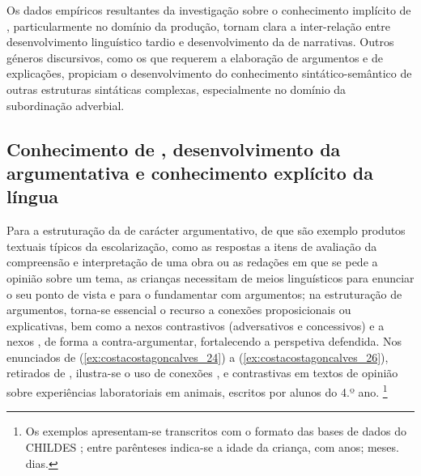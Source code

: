 \documentclass[output=paper]{LSP/langsci}
\begin{document}
Os dados empíricos resultantes da investigação sobre o conhecimento implícito de , particularmente no domínio da produção, tornam clara a inter-relação entre desenvolvimento linguístico tardio e desenvolvimento da  de narrativas. Outros géneros discursivos, como os que requerem a elaboração de argumentos e de explicações, propiciam o desenvolvimento do conhecimento sintático-semântico de outras estruturas sintáticas complexas, especialmente no domínio da subordinação adverbial. 

\subsection{Conhecimento de , desenvolvimento da  argumentativa e conhecimento explícito da língua}
\label{subsec:costacostagoncalves_conhecimento_concess}

Para a estruturação da  de carácter argumentativo, de que são exemplo produtos textuais típicos da escolarização, como as respostas a itens de avaliação da compreensão e interpretação de uma obra ou as redações em que se pede a opinião sobre um tema, as crianças necessitam de meios linguísticos para enunciar o seu ponto de vista e para o fundamentar com argumentos; na estruturação de argumentos, torna-se essencial o recurso a conexões proposicionais  ou explicativas, bem como a nexos contrastivos (adversativos e concessivos) e a nexos , de forma a contra‑argumentar, fortalecendo a perspetiva defendida. Nos enunciados de (\ref{ex:costacostagoncalves_24}) a (\ref{ex:costacostagoncalves_26}), retirados de \citet{alcosta2010}, ilustra-se o uso de conexões ,  e contrastivas em textos de opinião sobre experiências laboratoriais em animais, escritos por alunos do 4.º ano. \footnote{Os exemplos apresentam-se transcritos com o formato das bases de dados do CHILDES \citep{macwhinney2000}; entre parênteses indica-se a idade da criança, com anos; meses. dias.}

\z
{}\z
{}\z
\end{document}
